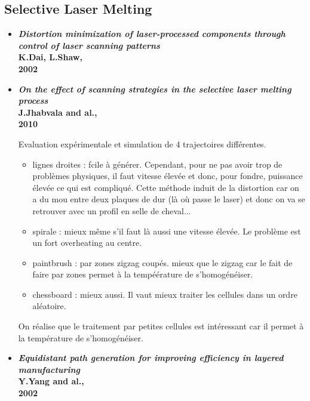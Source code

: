 \documentclass[11pt,a4paper]{article}
\begin{document}
\subsection{Selective Laser Melting}

\begin{itemize}
	\item \textbf{\emph{Distortion minimization of laser-processed components through control of laser scanning patterns} \\
		K.Dai, L.Shaw, \\
		2002}
		
		
	\item \textbf{\emph{On the effect of scanning strategies in the selective laser melting process} \\
		J.Jhabvala and al., \\
		2010}
	
		\vspace{0cm}
		
		Evaluation expérimentale et simulation de 4 trajectoires différentes. 
		\begin{itemize}
			\item lignes droites : fcile à générer. Cependant, pour ne pas avoir trop de problèmes physiques, il faut vitesse élevée et donc, pour fondre, puissance élevée ce qui est compliqué. Cette méthode induit de la distortion car on a du mou entre deux plaques de dur (là où passe le laser) et donc on va se retrouver avec un profil en selle de cheval...
			\item spirale : mieux même s'il faut là aussi une vitesse élevée. Le problème est un fort overheating au centre.
			\item paintbrush : par zones zigzag coupés. mieux que le zigzag car le fait de faire par zones permet à la tempéérature de s'homogénéiser. 
			\item chessboard : mieux aussi. Il vaut mieux traiter les cellules dans un ordre aléatoire.
		\end{itemize}
		On réalise que le traitement par petites cellules est intéressant car il permet à la température de s'homogénéiser.
		
	\item \textbf{\emph{Equidistant path generation for improving efficiency in layered manufacturing} \\
		Y.Yang and al., \\
		2002}
	

\end{itemize}
\end{document}
